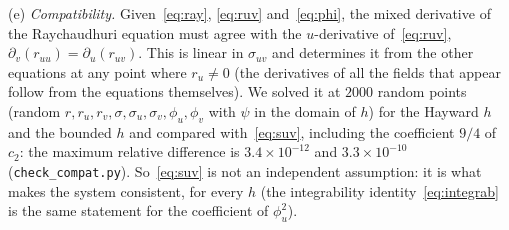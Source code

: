 \documentclass[11pt]{article}
\begin{document}
(e) \emph{Compatibility.} Given~\eqref{eq:ray}, \eqref{eq:ruv} and~\eqref{eq:phi}, the mixed derivative of the Raychaudhuri equation must agree with the $u$-derivative of~\eqref{eq:ruv}, $\partial_v(r_{uu})=\partial_u(r_{uv})$. This is linear in $\sigma_{uv}$ and determines it from the other equations at any point where $r_u\ne0$ (the derivatives of all the fields that appear follow from the equations themselves). We solved it at $2000$ random points (random $r,r_u,r_v,\sigma,\sigma_u,\sigma_v,\phi_u,\phi_v$ with $\psi$ in the domain of $h$) for the Hayward $h$ and the bounded $h$ and compared with~\eqref{eq:suv}, including the coefficient $9/4$ of $c_2$: the maximum relative difference is $3.4\times10^{-12}$ and $3.3\times10^{-10}$ (\texttt{check\_compat.py}). So~\eqref{eq:suv} is not an independent assumption: it is what makes the system consistent, for every $h$ (the integrability identity~\eqref{eq:integrab} is the same statement for the coefficient of $\phi_u^{2}$).
\end{document}
